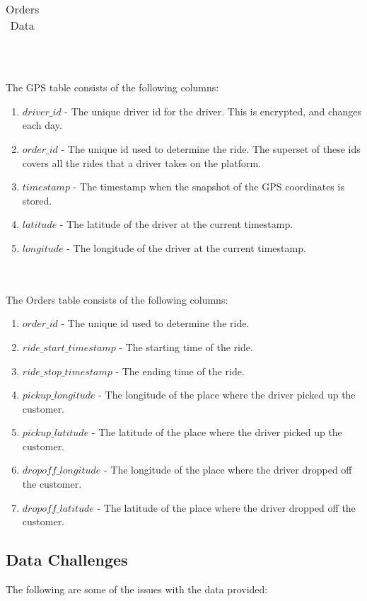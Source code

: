 \documentclass[11pt]{article}
\begin{document}
\begin{enumerate}
\begin{table}[h!]
\begin{tabular}{||c c c c||}
        \end{tabular}
        \caption{Orders Data}
        \label{table:2}
\end{table}
\end{enumerate}
\\\\
The GPS table consists of the following columns: 
\begin{enumerate}
    \item $driver\_id$ - The unique driver id for the driver. This is encrypted, and changes each day.
    \item $order\_id$ - The unique id used to determine the ride. The superset of these ids covers all the rides that a driver takes on the platform.
    \item $timestamp$ - The timestamp when the snapshot of the GPS coordinates is stored.
    \item $latitude$ - The latitude of the driver at the current timestamp.
    \item $longitude$ - The longitude of the driver at the current timestamp.
\end{enumerate}
\\\\
The Orders table consists of the following columns: 
\begin{enumerate}
    \item $order\_id$ - The unique id used to determine the ride.
    \item $ride\_start\_timestamp$ - The starting time of the ride.
    \item $ride\_stop\_timestamp$ - The ending time of the ride.
    \item $pickup\_longitude$ - The longitude of the place where the driver picked up the customer.
    \item $pickup\_latitude$ - The latitude of the place where the driver picked up the customer.
    \item $\mathit{dropoff}\_longitude$ - The longitude of the place where the driver dropped off the customer.
    \item $\mathit{dropoff}\_latitude$ - The latitude of the place where the driver dropped off the customer. 
    
\end{enumerate}

\subsection{Data Challenges}
The following are some of the issues with the data provided:
\end{document}
